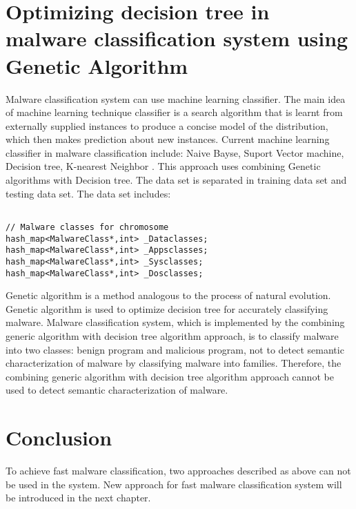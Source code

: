 \section{Optimizing decision tree in malware classification system using Genetic Algorithm}
Malware classification system can use machine learning classifier. The main idea of machine learning technique classifier is a search algorithm that is learnt from externally supplied instances to produce a concise model of the distribution, which then  makes prediction about new  instances. Current machine learning classifier in malware classification include: Naive Bayse, Suport Vector machine, Decision tree, K-nearest Neighbor \cite{mohd}. This approach uses combining Genetic algorithms with Decision tree. The data set is separated in training data set and testing data set. The data set includes:
\begin{verbatim}

// Malware classes for chromosome
hash_map<MalwareClass*,int> _Dataclasses;
hash_map<MalwareClass*,int> _Appsclasses;
hash_map<MalwareClass*,int> _Sysclasses;
hash_map<MalwareClass*,int> _Dosclasses;

\end{verbatim}
Genetic algorithm is a method analogous to the process of natural evolution. Genetic algorithm is used to optimize decision tree for accurately classifying malware. Malware classification system, which is implemented by the combining generic algorithm with decision tree algorithm approach, is to classify malware into two classes: benign program and malicious program, not to detect semantic characterization of malware by classifying malware into families. Therefore, the combining generic algorithm with decision tree algorithm approach cannot be used to detect semantic characterization of malware.
\section{Conclusion}
To achieve fast malware classification, two approaches described as above can not be used in the system. New approach for fast malware classification system will be introduced in the next chapter. 